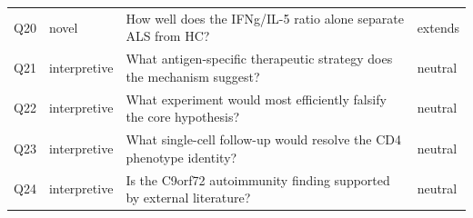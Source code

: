 \begin{tabular}{llp{8.3cm}l}
Q20 & novel & How well does the IFNg/IL-5 ratio alone separate ALS from HC? & extends \\
Q21 & interpretive & What antigen-specific therapeutic strategy does the mechanism suggest? & neutral \\
Q22 & interpretive & What experiment would most efficiently falsify the core hypothesis? & neutral \\
Q23 & interpretive & What single-cell follow-up would resolve the CD4 phenotype identity? & neutral \\
Q24 & interpretive & Is the C9orf72 autoimmunity finding supported by external literature? & neutral \\
\bottomrule
\end{tabular}
